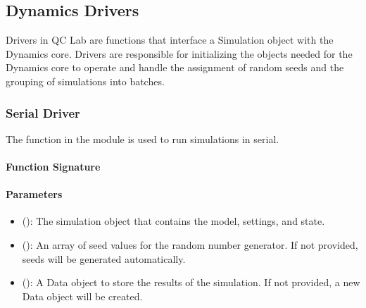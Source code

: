 \documentclass[letterpaper,10pt,english]{sphinxmanual}
\begin{document}
\sphinxstepscope


\subsection{Dynamics Drivers}
\label{\detokenize{user_guide/drivers/drivers:dynamics-drivers}}\label{\detokenize{user_guide/drivers/drivers:drivers}}\label{\detokenize{user_guide/drivers/drivers::doc}}
\sphinxAtStartPar
Drivers in QC Lab are functions that interface a Simulation object with the Dynamics core. Drivers are responsible for initializing the
objects needed for the Dynamics core to operate and handle the assignment of random seeds and the grouping of simulations into batches.

\sphinxstepscope


\subsubsection{Serial Driver}
\label{\detokenize{user_guide/drivers/serial_driver:serial-driver}}\label{\detokenize{user_guide/drivers/serial_driver:id1}}\label{\detokenize{user_guide/drivers/serial_driver::doc}}
\sphinxAtStartPar
The  function in the  module is used to run simulations in serial.


\paragraph{Function Signature}
\label{\detokenize{user_guide/drivers/serial_driver:function-signature}}
\begin{sphinxVerbatim}[commandchars=\\\{\}]
   
\end{sphinxVerbatim}


\paragraph{Parameters}
\label{\detokenize{user_guide/drivers/serial_driver:parameters}}\begin{itemize}
\item {} 
\sphinxAtStartPar
{} (): The simulation object that contains the model, settings, and state.

\item {} 
\sphinxAtStartPar
{} (): An array of seed values for the random number generator. If not provided, seeds will be generated automatically.

\item {} 
\sphinxAtStartPar
{} (): A Data object to store the results of the simulation. If not provided, a new Data object will be created.

\end{itemize}
\end{document}
